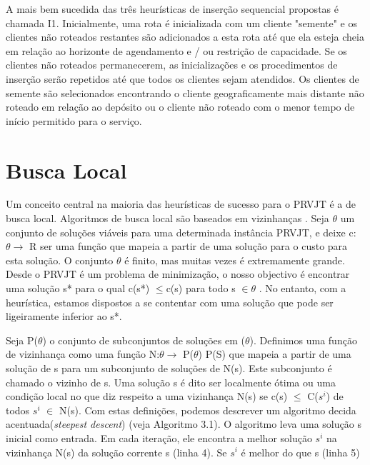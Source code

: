A mais bem sucedida das três heurísticas de inserção sequencial propostas é chamada I1. Inicialmente, uma rota é inicializada com um cliente "semente" e os clientes não roteados restantes são adicionados a esta rota até que ela esteja cheia em relação ao horizonte de agendamento e / ou restrição de capacidade. Se os clientes não roteados permanecerem, as inicializações e os procedimentos de inserção serão repetidos até que todos os clientes sejam atendidos. Os clientes de semente são selecionados encontrando o cliente geograficamente mais distante não roteado em relação ao depósito ou o cliente não roteado com o menor tempo de início permitido para o serviço.


\section{Busca Local}

Um conceito central na maioria das heurísticas de sucesso para o PRVJT é a de busca local. Algoritmos de busca local são baseados em vizinhanças . Seja $\theta$ um conjunto de soluções viáveis para uma determinada instância PRVJT, e deixe c: $\theta \to$ R ser uma função que mapeia a partir de uma solução para o custo para esta solução. O conjunto $\theta$ é finito, mas muitas vezes é extremamente grande. Desde o PRVJT é um problema de minimização, o nosso objectivo é encontrar uma solução s* para o qual c(s*) $ \leq $c(s) para todo s $\in \theta$ . No entanto, com a heurística, estamos dispostos a se contentar com uma solução que pode ser ligeiramente inferior ao s*.

 
 Seja P($\theta$) o conjunto de subconjuntos de soluções em ($\theta$). Definimos uma função de vizinhança como uma função N:$\theta \to $ P($\theta$) P(S) que mapeia a partir de uma solução de s para um subconjunto de soluções de N(s). Este subconjunto é chamado o vizinho de s. Uma solução s é dito ser localmente ótima ou uma condição local no que diz respeito a uma vizinhança N(s) se c(s) $ \leq $ C($s^i$) de todos $s^i$ $ \in $ N(s). Com estas definições, podemos descrever um algoritmo decida acentuada(\textit{steepest descent}) (veja Algoritmo 3.1). O algoritmo leva uma solução s inicial como entrada. Em cada iteração, ele encontra a melhor solução $s^i$ na vizinhança N(s) da solução corrente s (linha 4). Se $s^i$ é melhor do que s (linha 5)
 
